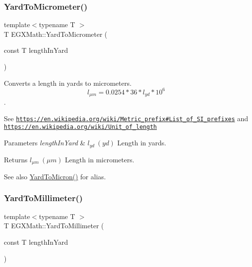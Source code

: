 \subsubsection{\texorpdfstring{Yard\+To\+Micrometer()}{YardToMicrometer()}}
{\footnotesize\ttfamily template$<$typename T $>$ \\
T E\+G\+X\+Math\+::\+Yard\+To\+Micrometer (\begin{DoxyParamCaption}\item[{const T}]{length\+In\+Yard }\end{DoxyParamCaption})}



Converts a length in yards to micrometers. \[ l_{\mu m}=0.0254 * 36 * l_{yd} * 10^{6} \]. 

See \href{https://en.wikipedia.org/wiki/Metric_prefix#List_of_SI_prefixes}{\tt https\+://en.\+wikipedia.\+org/wiki/\+Metric\+\_\+prefix\#\+List\+\_\+of\+\_\+\+S\+I\+\_\+prefixes} and \href{https://en.wikipedia.org/wiki/Unit_of_length}{\tt https\+://en.\+wikipedia.\+org/wiki/\+Unit\+\_\+of\+\_\+length} 
\begin{DoxyParams}{Parameters}
{\em length\+In\+Yard} & $ l_{yd}\ (yd)$ Length in yards. \\
\hline
\end{DoxyParams}
\begin{DoxyReturn}{Returns}
$ l_{\mu m}\ (\mu m)$ Length in micrometers. 
\end{DoxyReturn}
\begin{DoxySeeAlso}{See also}
\mbox{\hyperlink{group___e_g_x_math-_conversions-_length_conversions-_imperial-_yard-_non-_s_i_ga7d167f52b344853fd58dcc589e0ad301}{Yard\+To\+Micron()}} for alias. 
\end{DoxySeeAlso}
\mbox{\label{group___e_g_x_math-_conversions-_length_conversions-_imperial-_yard-_s_i_ga54f92a3a4238cd856ba21bdf1fe65d23}} 
\subsubsection{\texorpdfstring{Yard\+To\+Millimeter()}{YardToMillimeter()}}
{\footnotesize\ttfamily template$<$typename T $>$ \\
T E\+G\+X\+Math\+::\+Yard\+To\+Millimeter (\begin{DoxyParamCaption}\item[{const T}]{length\+In\+Yard }\end{DoxyParamCaption})}



